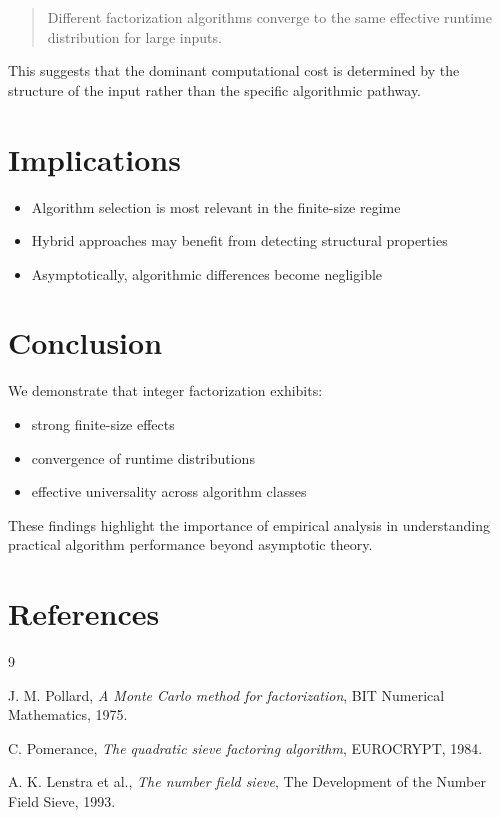 \documentclass[11pt,a4paper]{article}
\begin{document}
	\begin{quote}
		Different factorization algorithms converge to the same effective runtime distribution for large inputs.
	\end{quote}
	
	This suggests that the dominant computational cost is determined by the structure of the input rather than the specific algorithmic pathway.
	
	\section{Implications}
	
	\begin{itemize}
		\item Algorithm selection is most relevant in the finite-size regime
		\item Hybrid approaches may benefit from detecting structural properties
		\item Asymptotically, algorithmic differences become negligible
	\end{itemize}
	
	\section{Conclusion}
	
	We demonstrate that integer factorization exhibits:
	
	\begin{itemize}
		\item strong finite-size effects
		\item convergence of runtime distributions
		\item effective universality across algorithm classes
	\end{itemize}
	
	These findings highlight the importance of empirical analysis in understanding practical algorithm performance beyond asymptotic theory.
	
	\section*{References}
	
	\begin{thebibliography}{9}
		
		J. M. Pollard,
		\textit{A Monte Carlo method for factorization},
		BIT Numerical Mathematics, 1975.
		
		C. Pomerance,
		\textit{The quadratic sieve factoring algorithm},
		EUROCRYPT, 1984.
		
		A. K. Lenstra et al.,
		\textit{The number field sieve},
		The Development of the Number Field Sieve, 1993.
		
	\end{thebibliography}
	
\end{document}
